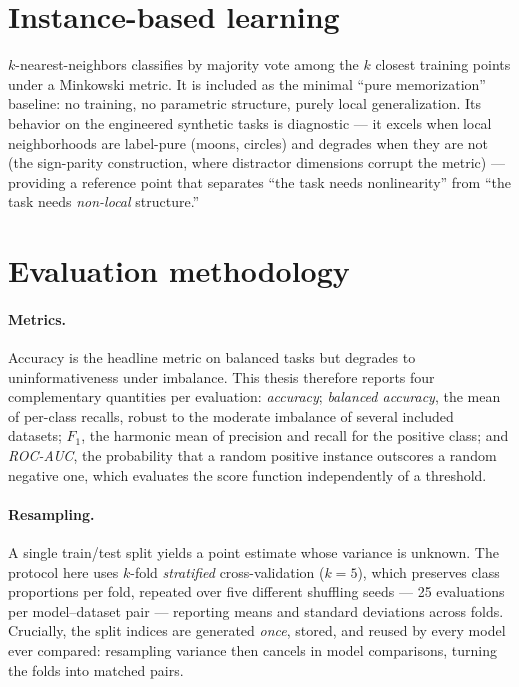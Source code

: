 \section{Instance-based learning}
\label{sec:ml-knn}

$k$-nearest-neighbors classifies by majority vote among the $k$ closest
training points under a Minkowski metric. It is included as the minimal
``pure memorization'' baseline: no training, no parametric structure, purely
local generalization. Its behavior on the engineered synthetic tasks is
diagnostic --- it excels when local neighborhoods are label-pure (moons,
circles) and degrades when they are not (the sign-parity construction, where
distractor dimensions corrupt the metric) --- providing a reference point that
separates ``the task needs nonlinearity'' from ``the task needs
\emph{non-local} structure.''

\section{Evaluation methodology}
\label{sec:ml-evaluation}

\paragraph{Metrics.}
Accuracy is the headline metric on balanced tasks but degrades to
uninformativeness under imbalance. This thesis therefore reports four
complementary quantities per evaluation: \emph{accuracy};
\emph{balanced accuracy}, the mean of per-class recalls, robust to the
moderate imbalance of several included datasets; $F_1$, the harmonic mean of
precision and recall for the positive class; and \emph{ROC-AUC}, the
probability that a random positive instance outscores a random negative one,
which evaluates the score function independently of a threshold.

\paragraph{Resampling.}
A single train/test split yields a point estimate whose variance is unknown.
The protocol here uses $k$-fold \emph{stratified} cross-validation ($k = 5$),
which preserves class proportions per fold, repeated over five different
shuffling seeds --- 25 evaluations per model--dataset pair --- reporting means
and standard deviations across folds. Crucially, the split indices are
generated \emph{once}, stored, and reused by every model ever compared:
resampling variance then cancels in model comparisons, turning the folds into
matched pairs.

